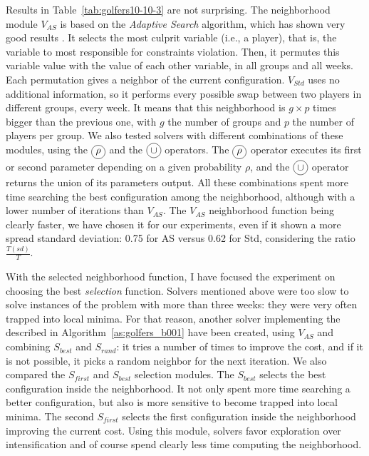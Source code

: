 Results in Table~\ref{tab:golfers10-10-3} are not surprising. The neighborhood module $V_{AS}$ is based on the {\it Adaptive Search} algorithm, which has shown very good results \cite{Diaz}. %
It selects the most culprit variable (i.e., a player), that is, the variable to most responsible for constraints violation. Then, it permutes this variable value with the value of each other variable, in all groups and all weeks. Each permutation gives a neighbor of the current configuration. $V_{Std}$ uses no additional information, so it performs every possible swap between two players in different groups, every week. It means that this neighborhood is $g\times p$ times bigger than the previous one, with $g$ the number of groups and $p$ the number of players per group. 
We also tested solvers with different combinations of these modules, using the $\circled{$\rho$}$ and the $\circled{$\cup$}$ operators. The $\circled{$\rho$}$ operator executes its first or second parameter depending on a given probability $\rho$, and the $\circled{$\cup$}$ operator returns the union of its parameters output. All these combinations spent more time searching the best configuration among the neighborhood, although with a lower number of iterations than $V_{AS}$. The $V_{AS}$ neighborhood function being clearly faster, we have chosen it for our experiments, even if it shown a more spread standard deviation: 0.75 for AS versus 0.62 for Std, considering the ratio $\tfrac{T(sd)}{T}$.

\separation

With the selected neighborhood function, I have focused the experiment on choosing the best {\it selection} function. Solvers mentioned above were too slow to solve instances of the problem with more than three weeks: they were very often trapped into local minima. For that reason, another solver implementing the \as{} described in Algorithm~\ref{as:golfers_b001} have been created, using $V_{AS}$ and combining $S_{best}$ and $S_{rand}$: it tries a number of times to improve the cost, and if it is not possible, it picks a random neighbor for the next iteration. We also compared the $S_{first}$ and $S_{best}$ selection modules. The \om{} $S_{best}$ selects the best configuration inside the neighborhood. It not only spent more time searching a better configuration, but also is more sensitive to become trapped into local minima. The second \om{} $S_{first}$ selects the first configuration inside the neighborhood improving the current cost. Using this module, solvers favor exploration over intensification and of course spend clearly less time computing the neighborhood. 

